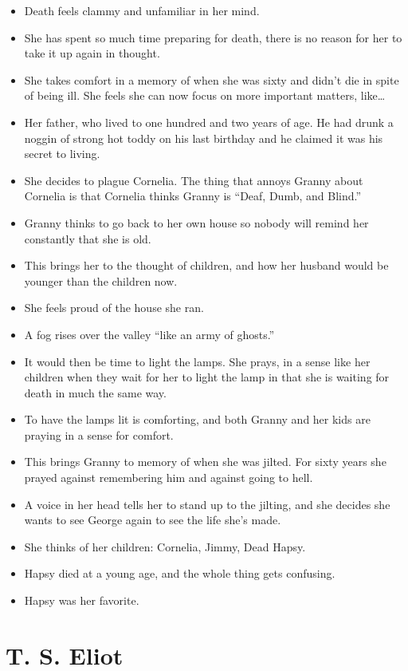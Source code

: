 \documentclass[11pt]{article}
\begin{document}
\begin{itemize}
	\item Death feels clammy and unfamiliar in her mind.
	\item She has spent so much time preparing for death, there is no reason for
		her to take it up again in thought.
	\item She takes comfort in a memory of when she was sixty and didn't die in
		spite of being ill.  She feels she can now focus on more important matters,
		like\ldots
	\item Her father, who lived to one hundred and two years of age. He had drunk 
		a noggin of strong hot toddy on his last birthday and he claimed it was his
		secret to living.
	\item She decides to plague Cornelia.  The thing that annoys Granny about
		Cornelia is that Cornelia thinks Granny is ``Deaf, Dumb, and Blind.''
	\item Granny thinks to go back to her own house so nobody will remind her 
		constantly that she is old.
	\item This brings her to the thought of children, and how her husband would
		be younger than the children now.
	\item She feels proud of the house she ran.
	\item A fog rises over the valley ``like an army of ghosts.''
	\item It would then be time to light the lamps.  She prays, in a sense like
		her children when they wait for her to light the lamp in that she is waiting
		for death in much the same way.
	\item To have the lamps lit is comforting, and both Granny and her kids are 
		praying in a sense for comfort.
	\item This brings Granny to memory of when she was jilted.  For sixty years
		she prayed against remembering him and against going to hell.
	\item A voice in her head tells her to stand up to the jilting, and she
		decides she wants to see George again to see the life she's made.
	\item She thinks of her children: Cornelia, Jimmy, Dead Hapsy.
	\item Hapsy died at a young age, and the whole thing gets confusing.
	\item Hapsy was her favorite.
\end{itemize}
\section{T. S. Eliot}
\end{document}
